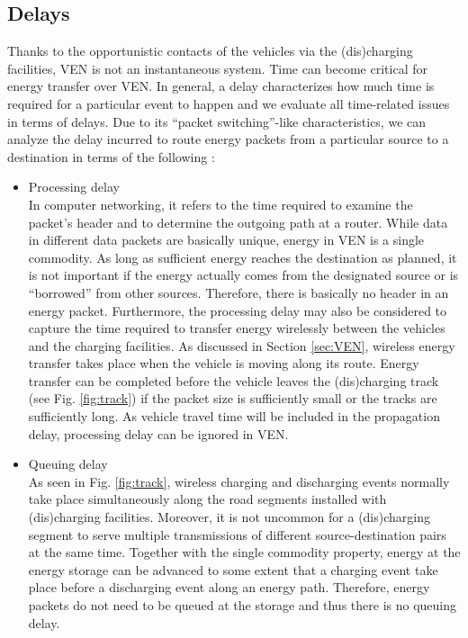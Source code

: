 \documentclass[journal]{IEEEtran}
\begin{document}
\subsection{Delays}
Thanks to the opportunistic contacts of the vehicles via the (dis)charging facilities, VEN is not an instantaneous system. Time can become critical for energy transfer over VEN. In general, a delay characterizes how much time is required for a particular event to happen and we evaluate all time-related issues in terms of delays.
Due to its ``packet switching''-like characteristics, we can analyze the delay incurred to route energy packets from a particular source to a destination in terms of the following \cite{networking}:
\begin{itemize}
	\item Processing delay\\
	In computer networking, it refers to the time required to examine the packet's header and to determine the outgoing path at a router. While data in different data packets are basically unique, energy in VEN is a single commodity. As long as sufficient energy reaches the destination as planned, it is not important if the energy actually comes from the designated source or is ``borrowed'' from other sources. Therefore, there is basically no header in an energy packet. Furthermore, the processing delay may also be considered to capture the time required to transfer energy wirelessly between the vehicles and the charging facilities. As discussed in Section \ref{sec:VEN}, wireless energy transfer takes place when the vehicle is moving along its route. Energy transfer can be completed before the vehicle leaves the (dis)charging track (see Fig. \ref{fig:track}) if the packet size  is sufficiently small or the tracks are sufficiently long. As vehicle travel time will be included in the propagation delay, processing delay can be ignored in VEN.
	\item Queuing delay\\
	As seen in Fig. \ref{fig:track}, wireless charging and discharging events normally take place simultaneously along the road segments installed with (dis)charging facilities. Moreover, it is not uncommon for a (dis)charging segment to serve multiple transmissions of different source-destination pairs at the same time. Together with the single commodity property, energy at the energy storage can be advanced to some extent that a charging event take place before a discharging event along an energy path. Therefore, energy packets do not need to be queued at the storage and thus there is no queuing delay.

\end{itemize}
\end{document}
